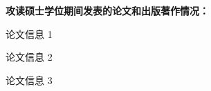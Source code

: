 \begin{publications}{99}

\item[] {{\songti{}\textbf{攻读硕士学位期间发表的论文和出版著作情况：}}}

\begin{enumerate}[label={[\arabic*]}]
\item 论文信息 1
\item 论文信息 2
\item 论文信息 3
\end{enumerate}

\end{publications}
